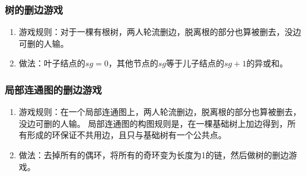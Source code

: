	\subsubsection*{树的删边游戏}
		\begin{enumerate}
			\item
				游戏规则：对于一棵有根树，两人轮流删边，脱离根的部分也算被删去，没边可删的人输。
			\item
				做法：叶子结点的$sg=0$，其他节点的$sg$等于儿子结点的$sg+1$的异或和。
		\end{enumerate}
	\subsubsection*{局部连通图的删边游戏}
		\begin{enumerate}
			\item
				游戏规则：在一个局部连通图上，两人轮流删边，脱离根的部分也算被删去，没边可删的人输。
				局部连通图的构图规则是，在一棵基础树上加边得到，所有形成的环保证不共用边，且只与基础树有一个公共点。
			\item
				做法：去掉所有的偶环，将所有的奇环变为长度为1的链，然后做树的删边游戏。
		\end{enumerate}
